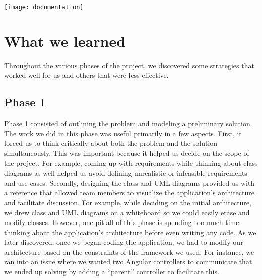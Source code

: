\documentclass[letterpaper, 12pt]{article}
\begin{document}
  \begin{centering}
  \texttt{[image: documentation]}
    \end{centering}

\section{What we learned}
Throughout the various phases of the project, we discovered some strategies that worked well for us and others that were less effective.

\subsection{Phase 1}
Phase 1 consisted of outlining the problem and modeling a preliminary solution.  The work we did in this phase was useful primarily in a few aspects. First, it forced us to think critically about both the problem and the solution simultaneously.  This was important because it helped us decide on the scope of the project.  For example, coming up with requirements while thinking about class diagrams as well helped us avoid defining unrealistic or infeasible requirements and use cases.  Secondly, designing the class and UML diagrams provided us with a reference that allowed team members to visualize the application's architecture and facilitate discussion. For example, while deciding on the initial architecture, we drew class and UML diagrams on a whiteboard so we could easily erase and modify classes.  However, one pitfall of this phase is spending too much time thinking about the application's architecture before even writing any code.  As we later discovered, once we began coding the application, we had to modify our architecture based on the constraints of the framework we used. For instance, we ran into an issue where we wanted two Angular controllers to communicate that we ended up solving by adding a ``parent'' controller to facilitate this.
\end{document}
